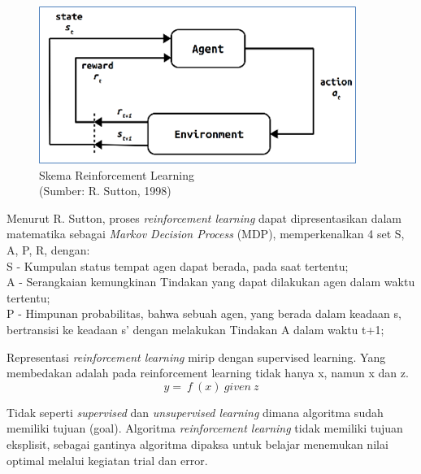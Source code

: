 \begin{figure}[H]
	\vspace{-0.1cm}
	\begin{center}
		\includegraphics[width=1\columnwidth]{bab2/Gambar/Picture11.png}
	\end{center}
	\vspace{-0.2cm}
	\captionsetup{justification=centering}
	\caption{Skema Reinforcement Learning\\(Sumber: R. Sutton, 1998)}\label{img:Skema-Reinforcement-Learning}
\end{figure}

Menurut R. Sutton, proses \textit{reinforcement learning} dapat dipresentasikan dalam matematika sebagai \textit{Markov Decision Process} (MDP), memperkenalkan 4 set {S, A, P, R}, dengan:\\
S - Kumpulan status tempat agen dapat berada, pada saat tertentu;\\
A - Serangkaian kemungkinan Tindakan yang dapat dilakukan agen dalam waktu tertentu;\\
P - Himpunan probabilitas, bahwa sebuah agen, yang berada dalam keadaan s, bertransisi ke keadaan s' dengan melakukan Tindakan A dalam waktu t+1;

Representasi \textit{reinforcement learning} mirip dengan supervised learning. Yang membedakan adalah pada reinforcement learning tidak hanya x, namun x dan z.
\[ y=\ f\ \left(x\right)\ given\ z \]

Tidak seperti \textit{supervised} dan \textit{unsupervised learning} dimana algoritma sudah memiliki tujuan (goal). Algoritma \textit{reinforcement learning} tidak memiliki tujuan eksplisit, sebagai gantinya algoritma dipaksa untuk belajar menemukan nilai optimal melalui kegiatan trial dan error.

